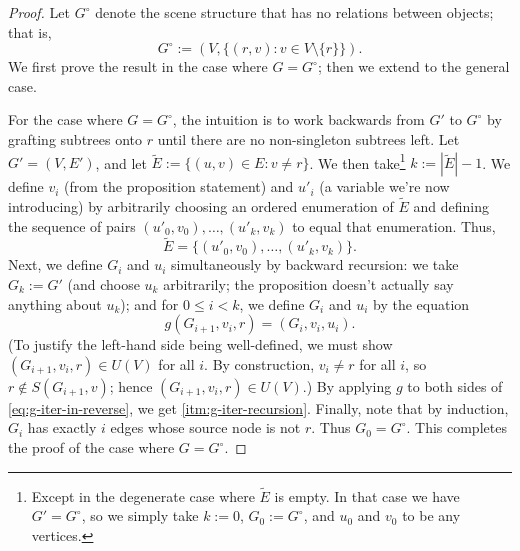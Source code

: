 \begin{proof}
Let $G^\circ$ denote the scene structure that has no relations between objects; that is,
\[ G^\circ := (V, \{(r, v) : v \in V \setminus \{r\}\}). \]
We first prove the result in the case where $G = G^\circ$; then we extend to the general case.

For the case where $G = G^\circ$, the intuition is to work backwards from $G'$ to $G^\circ$ by grafting subtrees onto $r$ until there are no non-singleton subtrees left.
Let $G' = (V, E')$, and let $\widetilde{E} := \{(u,v) \in E : v \neq r\}$.
We then take\footnote{
    Except in the degenerate case where $\widetilde{E}$ is empty.
    In that case we have $G' = G^\circ$, so we simply take $k := 0$, $G_0 := G^\circ$, and $u_0$ and $v_0$ to be any vertices.
} $k := |\widetilde{E}|-1$.
We define $v_i$ (from the proposition statement) and $u'_i$ (a variable we're now introducing) by arbitrarily choosing an ordered enumeration of $\widetilde{E}$ and defining the sequence of pairs $(u'_0, v_0), \ldots, (u'_k, v_k)$ to equal that enumeration.
Thus,
\[ \widetilde{E} = \{(u'_0, v_0), \ldots, (u'_k, v_k)\}. \]
Next, we define $G_i$ and $u_i$ simultaneously by backward recursion: we take $G_k := G'$ (and choose $u_k$ arbitrarily; the proposition doesn't actually say anything about $u_k$); and for $0 \leq i < k$, we define $G_i$ and $u_i$ by the equation
\begin{equation}
g(G_{i+1}, v_i, r) = (G_i, v_i, u_i).
\label{eq:g-iter-in-reverse}
\end{equation}
(To justify the left-hand side being well-defined, we must show $(G_{i+1}, v_i, r) \in U(V)$ for all $i$.  By construction, $v_i \neq r$ for all $i$, so $r \notin S(G_{i+1}, v)$; hence $(G_{i+1}, v_i, r) \in U(V)$.)
By applying $g$ to both sides of \eqref{eq:g-iter-in-reverse}, we get \ref{itm:g-iter-recursion}.
Finally, note that by induction, $G_i$ has exactly $i$ edges whose source node is not $r$.
Thus $G_0 = G^\circ$.
This completes the proof of the case where $G = G^\circ$.


\end{proof}
